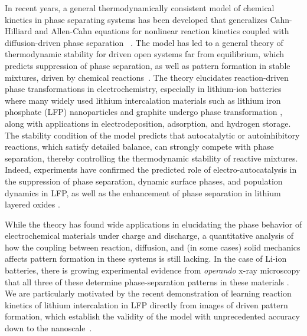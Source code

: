 \documentclass[reprint,aps,pre,superscriptaddress]{revtex4-2}
\begin{document}
In recent years, a general thermodynamically consistent model of chemical kinetics in phase separating systems has been developed that generalizes Cahn-Hilliard and Allen-Cahn equations for nonlinear reaction kinetics coupled with diffusion-driven phase separation ~\cite{Bazant2013}. The model has led to a general theory of thermodynamic stability for driven open systems far from equilibrium, which predicts suppression of phase separation, as well as pattern formation in stable mixtures, driven by chemical reactions~\cite{Bazant2017}. The theory elucidates reaction-driven phase transformations in electrochemistry, especially in lithium-ion batteries where many widely used lithium intercalation materials such as lithium iron phosphate (LFP) nanoparticles and graphite undergo phase transformation \cite{Lim2016,Bai2011,Cogswell2012,Cogswell2013,Nadkarni2018,Fraggedakis2020a,Cogswell2018a,Zhao2023LFP,Gao2021,Guo2016}, along with applications in electrodeposition, adsorption, and hydrogen storage\cite{Horstmann2013,Seri-Levy1993,Baldi2014,Narayan2017}. The stability condition of the model predicts that autocatalytic or autoinhibitory reactions, which satisfy detailed balance, can strongly compete with phase separation, thereby controlling the thermodynamic stability of reactive mixtures. Indeed, experiments have confirmed the predicted role of electro-autocatalysis in the suppression of phase separation, dynamic surface phases, and population dynamics in LFP\cite{Lim2016,Li2018a,Li2014,Zhao2023LFP,Koo2023,Zhao2019,Smith2017}, as well as the enhancement of phase separation in lithium layered oxides \cite{Park2021}.

While the theory has found wide applications in elucidating the phase behavior of electrochemical materials under charge and discharge, a quantitative analysis of how the coupling between reaction, diffusion, and (in some cases) solid mechanics affects pattern formation in these systems is still lacking. 
In the case of Li-ion batteries, there is growing experimental evidence from {\it operando} x-ray microscopy that all three of these determine phase-separation patterns in these materials \cite{lu20203d,cocco2013three,Ebner2013,Gent2016,Lim2016,Lin2017,Li2018a,cao2020emerging,Merryweather2021,Mefford2021,Gao2021,Xu2022}.  We are particularly motivated by the recent demonstration of learning reaction kinetics of lithium intercalation in LFP directly from images of driven pattern formation, which establish the validity of the model with unprecedented accuracy down to the nanoscale~\cite{Zhao2023LFP}.
\end{document}
